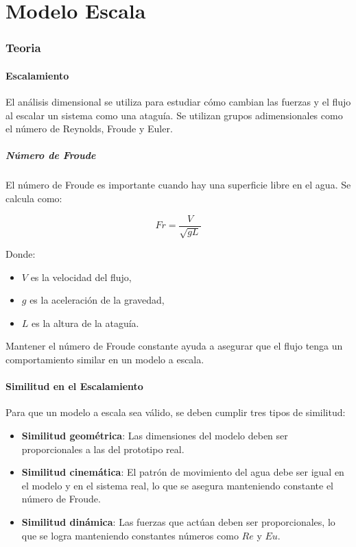 \part{Modelo Escala}

\section{Teoria}

\subsection{Escalamiento}
El análisis dimensional se utiliza para estudiar cómo cambian las fuerzas y el flujo al escalar un sistema como una ataguía. Se utilizan grupos adimensionales como el número de Reynolds, Froude y Euler.

\subsubsection{Número de Froude}
El número de Froude es importante cuando hay una superficie libre en el agua. Se calcula como:

\begin{equation}
Fr = \frac{V}{\sqrt{g L}}
\end{equation}

Donde:
\begin{itemize}
    \item $V$ es la velocidad del flujo,
    \item $g$ es la aceleración de la gravedad,
    \item $L$ es la altura de la ataguía.
\end{itemize}

Mantener el número de Froude constante ayuda a asegurar que el flujo tenga un comportamiento similar en un modelo a escala.


\subsection{Similitud en el Escalamiento}
Para que un modelo a escala sea válido, se deben cumplir tres tipos de similitud:

\begin{itemize}
    \item \textbf{Similitud geométrica}: Las dimensiones del modelo deben ser proporcionales a las del prototipo real.
    \item \textbf{Similitud cinemática}: El patrón de movimiento del agua debe ser igual en el modelo y en el sistema real, lo que se asegura manteniendo constante el número de Froude.
    \item \textbf{Similitud dinámica}: Las fuerzas que actúan deben ser proporcionales, lo que se logra manteniendo constantes números como $Re$ y $Eu$.
\end{itemize}

